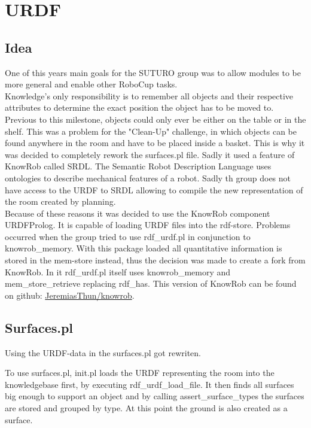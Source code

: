 \documentclass[main.tex]{subfiles}
\begin{document}
		\section{URDF}
		
		\subsection{Idea}
		One of this years main goals for the SUTURO group was to allow modules to be more general and enable other RoboCup tasks.\\
		Knowledge's only responsibility is to remember all objects and their respective attributes to determine the exact position the object has to be moved to.\\
		Previous to this milestone, objects could only ever be either on the table or in the shelf. This was a problem for the "Clean-Up" challenge, in which objects can be found anywhere in the room and have to be placed inside a basket. This is why it was decided to completely rework the surfaces.pl file. Sadly it used a feature of KnowRob called SRDL. The Semantic Robot Description Language uses ontologies to describe mechanical features of a robot. Sadly th group does not have access to the URDF to SRDL allowing to compile the new representation of the room created by planning.\\
		Because of these reasons it was decided to use the KnowRob component URDFProlog. It is capable of loading URDF files into the rdf-store. Problems occurred when the group tried to use rdf\_urdf.pl in conjunction to knowrob\_memory. With this package loaded all quantitative information is stored in the mem-store instead, thus the decision was made to create a fork from KnowRob. In it rdf\_urdf.pl itself uses knowrob\_memory and mem\_store\_retrieve replacing rdf\_has. This version of KnowRob  can be found on github: \hyperref[https://github.com/JeremiasThun/knowrob]{\mbox{JeremiasThun/knowrob}}.\\
		
		\subsection{Surfaces.pl}
		Using the URDF-data in the surfaces.pl got rewriten.
		\newpage
		\lstset{language=Prolog,numbers=left}
		
		To use surfaces.pl, init.pl loads the URDF representing the room into the knowledgebase first, by executing rdf\_urdf\_load\_file.
		It then finds all surfaces big enough to support an object and by calling assert\_surface\_types the surfaces are stored and grouped by type. At this point the ground is also created as a surface.\\
		
\end{document}
